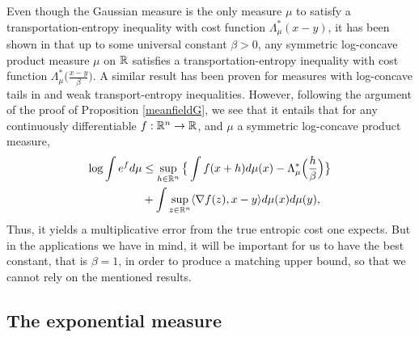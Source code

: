 \documentclass[a4paper,oneside,11pt]{article}
\begin{document}
Even though the Gaussian measure is the only measure $\mu$ to satisfy a transportation-entropy inequality with cost function $\Lambda^*_\mu(x-y)$, 
it has been shown in \cite{LW} that up to some universal constant $\beta>0$, any symmetric log-concave product measure $\mu$ on $\mathbb{R}$ satisfies a transportation-entropy inequality with cost function $\Lambda^*_\mu\big( \frac{x-y}{\beta}\big)$.  A similar result has been proven for measures with log-concave tails in \cite{SST} and weak transport-entropy inequalities. However, following the argument of the proof of Proposition \ref{meanfieldG}, we see that it entails that for any continuously differentiable $f : \mathbb{R}^n \to \mathbb{R}$, and $\mu$ a symmetric log-concave product measure, 
\begin{align*}
 \log \int e^f d\mu & \leq \sup_{h \in \mathbb{R}^n}\big\{ \int f(x+h) d\mu(x)  - \Lambda^*_{\mu}\Big(\frac{h}{\beta}\Big) \big\}\\&  + \int \sup_{z \in \mathbb{R}^n} \langle \nabla f(z), x-y \rangle d\mu(x) d\mu(y),\end{align*}
 Thus, it yields a multiplicative error from the true entropic cost one expects. But in the applications we have in mind, it will be important for us to have the best constant, that is $\beta = 1$, in order to produce a matching upper bound, so that we cannot rely on the mentioned results.

\subsection{The exponential measure}
\end{document}
